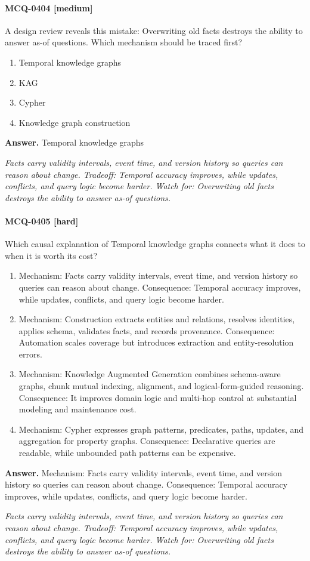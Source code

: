 \paragraph{MCQ-0404 [medium]} A design review reveals this mistake: Overwriting old facts destroys the ability to answer as-of questions. Which mechanism should be traced first?
\begin{enumerate}[label=\Alph*.]
\item Temporal knowledge graphs
\item KAG
\item Cypher
\item Knowledge graph construction
\end{enumerate}
\noindent\textbf{Answer.} Temporal knowledge graphs
\par\textit{Facts carry validity intervals, event time, and version history so queries can reason about change. Tradeoff: Temporal accuracy improves, while updates, conflicts, and query logic become harder. Watch for: Overwriting old facts destroys the ability to answer as-of questions.}
\paragraph{MCQ-0405 [hard]} Which causal explanation of Temporal knowledge graphs connects what it does to when it is worth its cost?
\begin{enumerate}[label=\Alph*.]
\item Mechanism: Facts carry validity intervals, event time, and version history so queries can reason about change. Consequence: Temporal accuracy improves, while updates, conflicts, and query logic become harder.
\item Mechanism: Construction extracts entities and relations, resolves identities, applies schema, validates facts, and records provenance. Consequence: Automation scales coverage but introduces extraction and entity-resolution errors.
\item Mechanism: Knowledge Augmented Generation combines schema-aware graphs, chunk mutual indexing, alignment, and logical-form-guided reasoning. Consequence: It improves domain logic and multi-hop control at substantial modeling and maintenance cost.
\item Mechanism: Cypher expresses graph patterns, predicates, paths, updates, and aggregation for property graphs. Consequence: Declarative queries are readable, while unbounded path patterns can be expensive.
\end{enumerate}
\noindent\textbf{Answer.} Mechanism: Facts carry validity intervals, event time, and version history so queries can reason about change. Consequence: Temporal accuracy improves, while updates, conflicts, and query logic become harder.
\par\textit{Facts carry validity intervals, event time, and version history so queries can reason about change. Tradeoff: Temporal accuracy improves, while updates, conflicts, and query logic become harder. Watch for: Overwriting old facts destroys the ability to answer as-of questions.}
